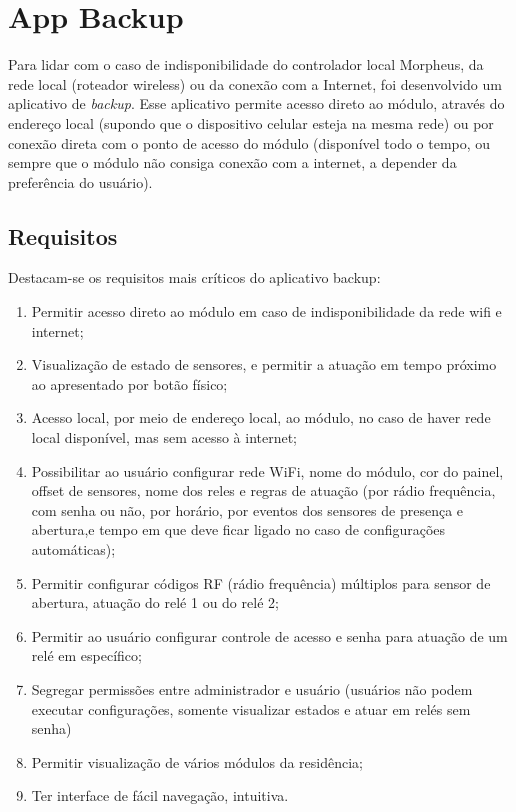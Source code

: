 \section{App Backup}

Para lidar com o caso de indisponibilidade do controlador local Morpheus, da rede local (roteador wireless) ou da conexão com a Internet, foi desenvolvido um aplicativo de \textit{backup}. Esse aplicativo permite acesso direto ao módulo, através do endereço local (supondo que o dispositivo celular esteja na mesma rede) ou por conexão direta com o ponto de acesso do módulo (disponível todo o tempo, ou sempre que o módulo não consiga conexão com a internet, a depender da preferência do usuário).

\subsection{Requisitos}

Destacam-se os requisitos mais críticos do aplicativo backup:

\begin{enumerate}
	\item Permitir acesso direto ao módulo em caso de indisponibilidade da rede wifi e internet;
	\item Visualização de estado de sensores, e permitir a atuação em tempo próximo ao apresentado por botão físico;
	\item Acesso local, por meio de endereço local, ao módulo, no caso de haver rede local disponível, mas sem acesso à internet;
	\item Possibilitar ao usuário configurar rede WiFi, nome do módulo, cor do painel, offset de sensores, nome dos reles e regras de atuação (por rádio frequência, com senha ou não, por horário, por eventos dos sensores de presença e abertura,e tempo em que deve ficar ligado no caso de configurações automáticas);
	\item Permitir configurar códigos RF (rádio frequência) múltiplos para sensor de abertura, atuação do relé 1 ou do relé 2;
	\item Permitir ao usuário configurar controle de acesso e senha para atuação de um relé em específico;
	\item Segregar permissões entre administrador e usuário (usuários não podem executar configurações, somente visualizar estados e atuar em relés sem senha)
	\item Permitir visualização de vários módulos da residência;
	\item Ter interface de fácil navegação, intuitiva.
\end{enumerate}

